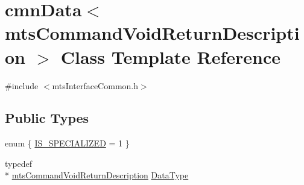\hypertarget{classcmn_data_3_01mts_command_void_return_description_01_4}{\section{cmn\-Data$<$ mts\-Command\-Void\-Return\-Description $>$ Class Template Reference}
\label{classcmn_data_3_01mts_command_void_return_description_01_4}
}


{\ttfamily \#include $<$mts\-Interface\-Common.\-h$>$}

\subsection*{Public Types}
\begin{DoxyCompactItemize}
\item 
enum \{ \hyperlink{classcmn_data_3_01mts_command_void_return_description_01_4_a79bf965b757696b5c36308779329fca4a9b461dc10cde644de4a375a8da73eaf7}{I\-S\-\_\-\-S\-P\-E\-C\-I\-A\-L\-I\-Z\-E\-D} = 1
 \}
\item 
typedef \\*
\hyperlink{classmts_command_void_return_description}{mts\-Command\-Void\-Return\-Description} \hyperlink{classcmn_data_3_01mts_command_void_return_description_01_4_aff459b36dbdb34ec4dc27dbfea116040}{Data\-Type}
\end{DoxyCompactItemize}
